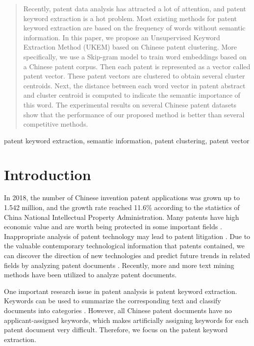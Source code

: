 \documentclass[conference]{IEEEtran}
\begin{document}
\begin{CJK}{UTF8}{gbsn}
	\begin{abstract}
		Recently, patent data analysis has attracted a lot of attention, and patent keyword extraction is a hot problem. Most existing methods for patent keyword extraction are based on the frequency of words without semantic information. In this paper, we propose an Unsupervised Keyword Extraction Method (UKEM) based on Chinese patent clustering. More specifically, we use a Skip-gram model to train word embeddings based on a Chinese patent corpus. Then each patent is represented as a vector called patent vector. These patent vectors are clustered to obtain several cluster centroids. Next, the distance between each word vector in patent abstract and cluster centroid is computed to indicate the semantic importance of this word. The experimental results on several Chinese patent datasets show that the performance of our proposed method is better than several competitive methods.
	\end{abstract}
	
	\begin{IEEEkeywords}
		patent keyword extraction, semantic information, patent clustering, patent vector
	\end{IEEEkeywords}
	
	\section{Introduction}
	In 2018, the number of Chinese invention patent applications was grown up to 1.542 million, and the growth rate reached 11.6\% according to the statistics of China National Intellectual Property Administration. Many patents have high economic value and are worth being protected in some important fields \cite{b1}. Inappropriate analysis of patent technology may lead to patent litigation \cite{b2}. Due to the valuable contemporary technological information that patents contained, we can discover the direction of new technologies and predict future trends in related fields by analyzing patent documents \cite{b3}. Recently, more and more text mining methods have been utilized to analyze patent documents.
	
	One important research issue in patent analysis is patent keyword extraction. Keywords can be used to summarize the corresponding text and classify documents into categories \cite{b4}. However, all Chinese patent documents have no applicant-assigned keywords, which makes artificially assigning keywords for each patent document very difficult. Therefore, we focus on the patent keyword extraction.
	

\end{CJK}
\end{document}

